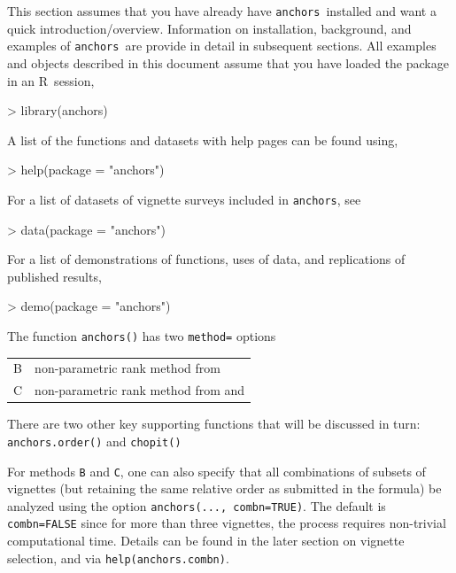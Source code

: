 \documentclass{amsart}
\newcommand{\code}[1]{{\texttt{#1}}}
\newcommand{\R}{{\normalfont\textsf{R}}{}}
\newcommand{\Ranchors}{{\texttt{anchors}}}
\begin{document}
This section assumes that you have already have \Ranchors\ installed
and want a quick introduction/overview.  Information on installation,
background, and examples of \Ranchors\ are provide in detail in
subsequent sections.  All examples and objects described in this
document assume that you have loaded the package in an \R\ session,
\begin{Schunk}
\begin{Sinput}
> library(anchors)
\end{Sinput}
\end{Schunk}

A list of the functions and datasets with help pages can be found using,
\begin{Schunk}
\begin{Sinput}
> help(package = "anchors")
\end{Sinput}
\end{Schunk}
For a list of datasets of vignette surveys included in \Ranchors, see
\begin{Schunk}
\begin{Sinput}
> data(package = "anchors")
\end{Sinput}
\end{Schunk}
For a list of demonstrations of functions, uses of data, and
replications of published results,
\begin{Schunk}
\begin{Sinput}
> demo(package = "anchors")
\end{Sinput}
\end{Schunk}
The function \code{anchors()} has two \code{method=} options

\begin{tabular}{ll}
  B   & non-parametric rank method from \cite{wand:2007a}\\
  C   & non-parametric rank method from \cite{king:2004} and \cite{king.wand:2007}\\
\end{tabular}

There are two other key supporting functions that will be discussed in
turn: \code{anchors.order()} and \code{chopit()}

\noindent
For methods \code{B} and \code{C}, one can also specify that all
combinations of subsets of vignettes (but retaining the same relative
order as submitted in the formula) be analyzed using the option
\code{anchors(..., combn=TRUE)}.  The default is \code{combn=FALSE}
since for more than three vignettes, the process requires non-trivial
computational time.  Details can be found in the later section on
vignette selection, and via \code{help(anchors.combn)}.
\end{document}
